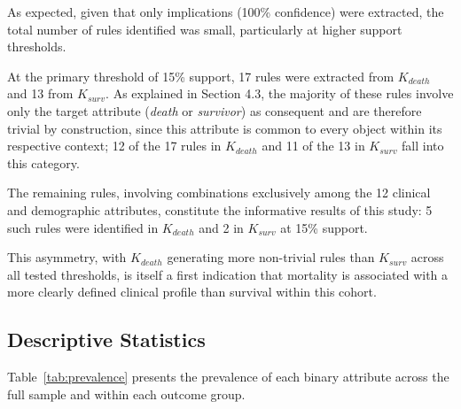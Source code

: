 \documentclass[a4paper,twoside]{article}
\begin{document}
As expected, given that only implications (100\% confidence) were extracted, the total number of rules identified was small, particularly at higher support thresholds.

At the primary threshold of 15\% support, 17 rules were extracted from $K_{death}$ and 13 from $K_{surv}$. As explained in Section 4.3, the majority of these rules involve only the target attribute (\textit{death} or \textit{survivor}) as consequent and are therefore trivial by construction, since this attribute is common to every object within its respective context; 12 of the 17 rules in $K_{death}$ and 11 of the 13 in $K_{surv}$ fall into this category. 

The remaining rules, involving combinations exclusively among the 12 clinical and demographic attributes, constitute the informative results of this study: 5 such rules were identified in $K_{death}$ and 2 in $K_{surv}$ at 15\% support. 

This asymmetry, with $K_{death}$ generating more non-trivial rules than $K_{surv}$ across all tested thresholds, is itself a first indication that mortality is associated with a more clearly defined clinical profile than survival within this cohort.

\subsection{Descriptive Statistics}

Table~\ref{tab:prevalence} presents the prevalence of each binary attribute across the full sample and within each outcome group. 
\end{document}
